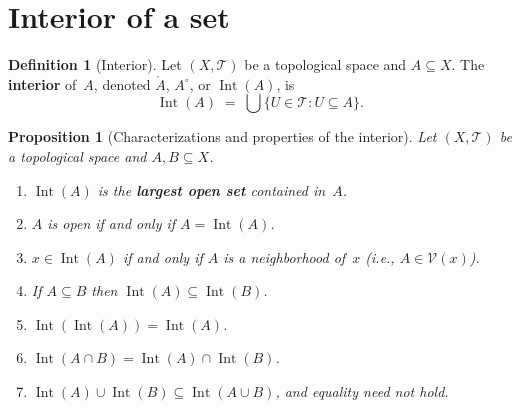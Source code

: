 \documentclass[11pt,a4paper,twoside]{book}
\newtheorem{proposition}[theorem]{Proposition}
\theoremstyle{remark}
\theoremstyle{definition}
\theoremstyle{definition}
\newtheorem{definition}{Definition}[section]
\newcommand{\Tau}{\mathcal{T}}           %
\newcommand{\interior}[1]{\mathring{#1}} %
\newcommand{\Nbhd}{\mathcal{V}}          %
\DeclareMathOperator{\Int}{Int}
\begin{document}
\section{Interior of a set}
\label{sec:interior}

\begin{definition}[Interior]\label{def:interior}
Let $(X,\Tau)$ be a topological space and $A\subseteq X$.  The
\textbf{interior} of~$A$, denoted $\interior{A}$, $A^\circ$, or $\Int(A)$, is
\[
  \Int(A) \;=\; \bigcup\{U\in\Tau : U\subseteq A\}.
\]
\end{definition}

\begin{proposition}[Characterizations and properties of the interior]
\label{prop:interior-properties}
Let $(X,\Tau)$ be a topological space and $A,B\subseteq X$.
\begin{enumerate}[label=\textup{(\roman*)}]
  \item\label{int:largest-open}
        $\Int(A)$ is the \textbf{largest open set} contained in~$A$.
  \item\label{int:open-iff}
        $A$ is open if and only if $A=\Int(A)$.
  \item\label{int:membership}
        $x\in\Int(A)$ if and only if $A$ is a neighborhood of~$x$ (i.e.,
        $A\in\Nbhd(x)$).
  \item\label{int:monotone}
        If $A\subseteq B$ then $\Int(A)\subseteq\Int(B)$.
  \item\label{int:idempotent}
        $\Int(\Int(A))=\Int(A)$.
  \item\label{int:intersection}
        $\Int(A\cap B)=\Int(A)\cap\Int(B)$.
  \item\label{int:supset}
        $\Int(A)\cup\Int(B)\subseteq\Int(A\cup B)$, and equality need not
        hold.
\end{enumerate}
\end{proposition}
\end{document}
